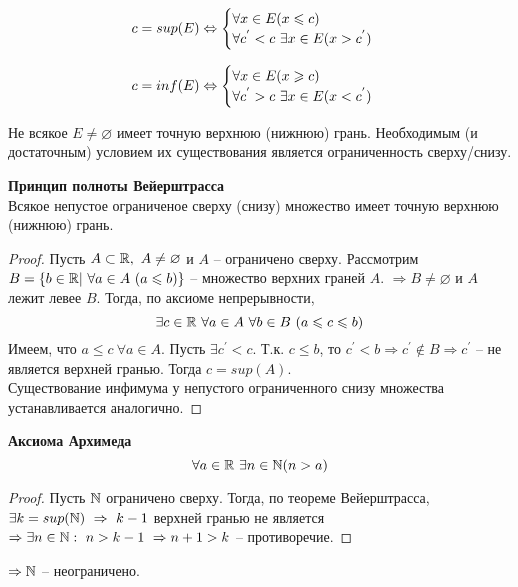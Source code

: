     \[c = sup(E) \Leftrightarrow
    \begin{cases}
        \forall x \in E (x \leqslant c)
        \\
        \forall c^{'} < c \  \exists x \in E (x > c^{'})
    \end{cases}\]
    
    \[c = inf(E) \Leftrightarrow
    \begin{cases}
        \forall x \in E (x \geqslant c)
        \\
        \forall c^{'} > c \  \exists x \in E (x < c^{'})
    \end{cases}\]
    
    \begin{note}
        Не всякое $E \neq \varnothing$ имеет точную верхнюю (нижнюю) грань. Необходимым (и достаточным) условием их существования является ограниченность сверху/снизу.
    \end{note}

    \begin{theorem}{\textbf{Принцип полноты Вейерштрасса}}\\
        Всякое непустое ограниченое сверху (снизу) множество имеет точную верхнюю (нижнюю) грань.
    \end{theorem}
    
    \begin{proof}
        Пусть $A \subset \mathbb{R}, \ A \neq \varnothing$ и $A$ -- ограничено сверху. Рассмотрим $B = \{b \in \mathbb{R}| \ \forall a \in A \  (a \leqslant b)\}$ -- множество верхних граней $A$. $\Rightarrow B \neq \varnothing$ и $A$ лежит левее $B$. Тогда, по аксиоме непрерывности, 
        \[\exists c \in \mathbb{R} \ \forall a \in A \ \forall b \in B \ (a \leqslant c \leqslant b)\]
        Имеем, что $a \leq c \ \forall a \in A$. Пусть $\exists c^{'} < c$. Т.к. $c \leq b$, то $c^{'} < b \Rightarrow c^{'} \notin B \Rightarrow c^{'}$ -- не является верхней гранью. Тогда $c = sup(A)$.
        \\
        Существование инфимума у непустого ограниченного снизу множества устанавливается аналогично.
    \end{proof}

    \begin{theorem}{\textbf{Аксиома Архимеда}}\\
        \[\forall a \in \mathbb{R} \ \exists n \in \mathbb{N} (n > a)\]
    \end{theorem}
    
    \begin{proof}
        Пусть $\mathbb{N}$ ограничено сверху. Тогда, по теореме Вейерштрасса, $\exists k = sup(\mathbb{N}) \ \Rightarrow \ k-1$ верхней гранью не является $\Rightarrow \exists n \in \mathbb{N}: \ n > k - 1 \ \Rightarrow n + 1 > k$ -- противоречие.
    \end{proof}
    $\Rightarrow \mathbb{N}$ -- неограничено. 

